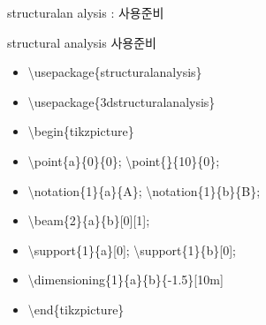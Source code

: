 \documentclass[ aspectratio=169,  12pt,blue,xcolor=pdftex,dvipsnames,table,handout,notes]{beamer}
\begin{document}
		\begin{frame}[t]{structuralan alysis : 사용준비 }


			\begin{block}{structural analysis 사용준비}
			\begin{itemize}
			\item[] \textbackslash usepackage\{structuralanalysis\}
			\item[] \textbackslash usepackage\{3dstructuralanalysis\}
			\end{itemize}
			\end{block}



			\begin{example}
					\centering
					\vskip 2mm
					\vskip 2mm	
			\end{example}

			\begin{itemize}
			\item[] \textbackslash begin\{tikzpicture\}
			\item[] \textbackslash point\{a\}\{0\}\{0\}; \textbackslash point\{\b\}\{10\}\{0\};
			\item[] \textbackslash notation\{1\}\{a\}\{A\};	 \textbackslash notation\{1\}\{b\}\{B\};
			\item[] \textbackslash beam\{2\}\{a\}\{b\}[0][1];
			\item[] \textbackslash support\{1\}\{a\}[0]; \textbackslash support\{1\}\{b\}[0];
			\item[] \textbackslash dimensioning\{1\}\{a\}\{b\}\{-1.5\}[10m]
			\item[] \textbackslash end\{tikzpicture\}
			\end{itemize}


		\end{frame}

\end{document}
